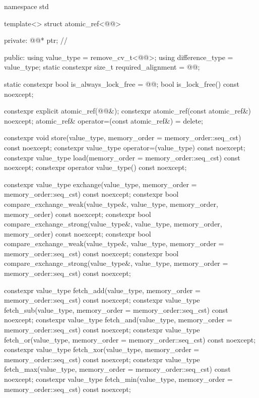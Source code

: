 \begin{codeblock}
namespace std {
  template<> struct atomic_ref<@@> {
  private:
    @@* ptr;         // \expos

  public:
    using value_type = remove_cv_t<@@>;
    using difference_type = value_type;
    static constexpr size_t required_alignment = @@;

    static constexpr bool is_always_lock_free = @@;
    bool is_lock_free() const noexcept;

    constexpr explicit atomic_ref(@@&);
    constexpr atomic_ref(const atomic_ref&) noexcept;
    atomic_ref& operator=(const atomic_ref&) = delete;

    constexpr void store(value_type, memory_order = memory_order::seq_cst) const noexcept;
    constexpr value_type operator=(value_type) const noexcept;
    constexpr value_type load(memory_order = memory_order::seq_cst) const noexcept;
    constexpr operator value_type() const noexcept;

    constexpr value_type exchange(value_type,
                                  memory_order = memory_order::seq_cst) const noexcept;
    constexpr bool compare_exchange_weak(value_type&, value_type,
                                         memory_order, memory_order) const noexcept;
    constexpr bool compare_exchange_strong(value_type&, value_type,
                                           memory_order, memory_order) const noexcept;
    constexpr bool compare_exchange_weak(value_type&, value_type,
                                         memory_order = memory_order::seq_cst) const noexcept;
    constexpr bool compare_exchange_strong(value_type&, value_type,
                                           memory_order = memory_order::seq_cst) const noexcept;

    constexpr value_type fetch_add(value_type,
                                   memory_order = memory_order::seq_cst) const noexcept;
    constexpr value_type fetch_sub(value_type,
                                   memory_order = memory_order::seq_cst) const noexcept;
    constexpr value_type fetch_and(value_type,
                                   memory_order = memory_order::seq_cst) const noexcept;
    constexpr value_type fetch_or(value_type,
                                  memory_order = memory_order::seq_cst) const noexcept;
    constexpr value_type fetch_xor(value_type,
                                   memory_order = memory_order::seq_cst) const noexcept;
    constexpr value_type fetch_max(value_type,
                                   memory_order = memory_order::seq_cst) const noexcept;
    constexpr value_type fetch_min(value_type,
                                   memory_order = memory_order::seq_cst) const noexcept;

}}
\end{codeblock}
